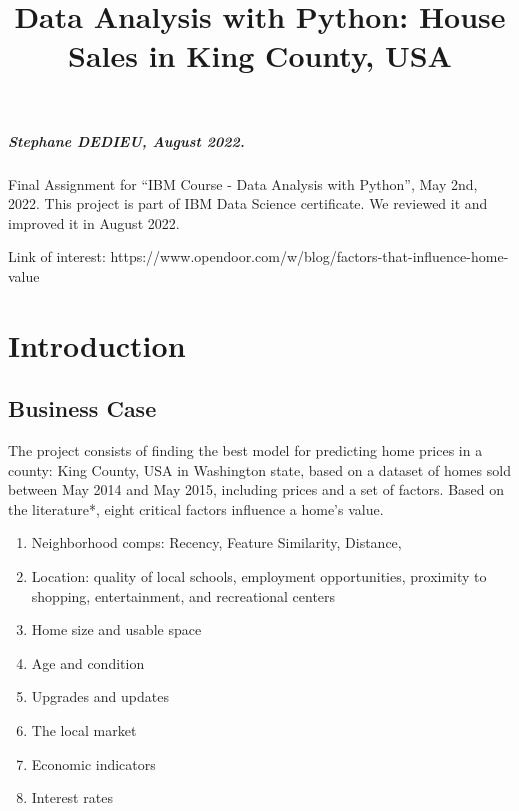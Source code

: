 \documentclass[11pt]{article}
\title{ Data Analysis with Python: House Sales in King County, USA}
\providecommand{\tightlist}{%
      \setlength{\itemsep}{0pt}\setlength{\parskip}{0pt}}
\begin{document}
    
    \maketitle

    \hypertarget{stephane-dedieu-august-2022.}{%
\subparagraph{Stephane DEDIEU, August
2022.}\label{stephane-dedieu-august-2022.}}
  

    Final Assignment for ``IBM Course - Data Analysis with Python'', May
2nd, 2022. This project is part of IBM Data Science certificate. We
reviewed it and improved it in August 2022.

Link of interest:
https://www.opendoor.com/w/blog/factors-that-influence-home-value

    \hypertarget{introduction}{%
\section{Introduction}\label{introduction}}

\hypertarget{business-case}{%
\subsection{Business Case}\label{business-case}}

The project consists of finding the best model for predicting home
prices in a county: King County, USA in Washington state, based on a
dataset of homes sold between May 2014 and May 2015, including prices
and a set of factors. Based on the literature*, eight critical factors
influence a home's value.

\begin{enumerate}
\def\labelenumi{\arabic{enumi}.}
\tightlist
\item
  Neighborhood comps: Recency, Feature Similarity, Distance,
\item
  Location: quality of local schools, employment opportunities,
  proximity to shopping, entertainment, and recreational centers
\item
  Home size and usable space
\item
  Age and condition
\item
  Upgrades and updates
\item
  The local market
\item
  Economic indicators
\item
  Interest rates
\end{enumerate}
\end{document}
